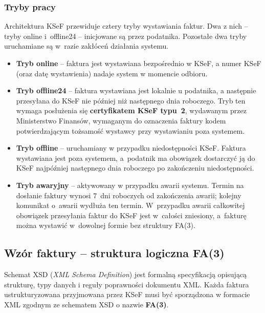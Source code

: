 \subsubsection{Tryby pracy}
\label{sec:ksef-tryby-pracy}

Architektura KSeF przewiduje cztery tryby wystawiania faktur. Dwa z nich -- tryby online i~offline24 -- inicjowane są przez podatnika. Pozostałe dwa tryby uruchamiane są w~razie zakłóceń działania systemu. \cite{ksef-plan-wdrozenia,ksef-tryby-offline}

\begin{itemize}
    \item \textbf{Tryb online} -- faktura jest wystawiana bezpośrednio w KSeF, a numer KSeF (oraz datę wystawienia) nadaje system w momencie odbioru.
    \item \textbf{Tryb offline24} -- faktura wystawiana jest lokalnie u podatnika, a następnie przesyłana do KSeF nie później niż następnego dnia roboczego. Tryb ten wymaga posłużenia się \textbf{certyfikatem KSeF typu~2}, wydawanym przez Ministerstwo Finansów, wymaganym do oznaczenia faktury kodem potwierdzającym tożsamość wystawcy przy wystawianiu poza systemem. \cite{ksef-certyfikaty}
    \item \textbf{Tryb offline} -- uruchamiany w przypadku niedostępności KSeF. Faktura wystawiana jest poza systemem, a~podatnik ma obowiązek dostarczyć ją do KSeF najpóźniej następnego dnia roboczego po zakończeniu niedostępności.
    \item \textbf{Tryb awaryjny} -- aktywowany w przypadku awarii systemu. Termin na dosłanie faktury wynosi 7~dni roboczych od zakończenia awarii; kolejny komunikat o~awarii wydłuża ten termin. W~przypadku awarii całkowitej obowiązek przesyłania faktur do KSeF jest w~całości zniesiony, a~fakturę można wystawić w~dowolnej formie bez struktury FA(3).
\end{itemize}

\subsection{Wzór faktury -- struktura logiczna FA(3)}
\label{sec:ksef-wzor-faktury}

Schemat XSD (\textit{XML Schema Definition}) jest formalną specyfikacją opisującą strukturę, typy danych i reguły poprawności dokumentu XML. Każda faktura ustrukturyzowana przyjmowana przez KSeF musi być sporządzona w formacie XML zgodnym ze schematem XSD o nazwie \textbf{FA(3)}. \cite{ksef-w-pigulce}

